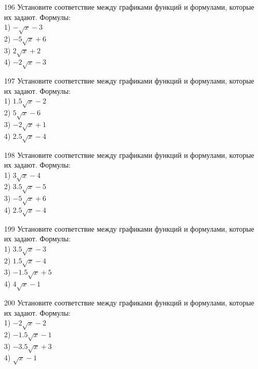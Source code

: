 \documentclass[4apaper]{article}
\begin{document}
\begin{taskBN}{196}
Установите соответствие между графиками функций и формулами, которые их задают. Формулы: \\1) $-\sqrt{x}-3$\\2) $-5\sqrt{x}+6$\\3) $2\sqrt{x}+2$\\4) $-2\sqrt{x}-3$
\end{taskBN}

\begin{taskBN}{197}
Установите соответствие между графиками функций и формулами, которые их задают. Формулы: \\1) $1.5\sqrt{x}-2$\\2) $5\sqrt{x}-6$\\3) $-2\sqrt{x}+1$\\4) $2.5\sqrt{x}-4$
\end{taskBN}

\begin{taskBN}{198}
Установите соответствие между графиками функций и формулами, которые их задают. Формулы: \\1) $3\sqrt{x}-4$\\2) $3.5\sqrt{x}-5$\\3) $-5\sqrt{x}+6$\\4) $2.5\sqrt{x}-4$
\end{taskBN}

\begin{taskBN}{199}
Установите соответствие между графиками функций и формулами, которые их задают. Формулы: \\1) $3.5\sqrt{x}-3$\\2) $1.5\sqrt{x}-4$\\3) $-1.5\sqrt{x}+5$\\4) $4\sqrt{x}-1$
\end{taskBN}

\begin{taskBN}{200}
Установите соответствие между графиками функций и формулами, которые их задают. Формулы: \\1) $-2\sqrt{x}-2$\\2) $-1.5\sqrt{x}-1$\\3) $-3.5\sqrt{x}+3$\\4) $\sqrt{x}-1$
\end{taskBN}
\end{document}
